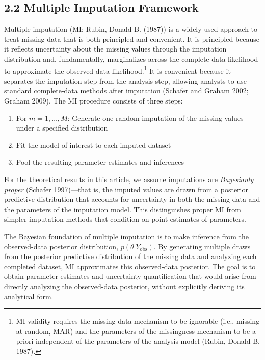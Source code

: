 \documentclass[
]{article}
\providecommand{\tightlist}{%
  \setlength{\itemsep}{0pt}\setlength{\parskip}{0pt}}
\begin{document}
\subsection{2.2 Multiple Imputation
Framework}\label{multiple-imputation-framework}

Multiple imputation (MI; Rubin, Donald B. (1987)) is a widely-used
approach to treat missing data that is both principled and convenient.
It is principled because it reflects uncertainty about the missing
values through the imputation distribution and, fundamentally,
marginalizes across the complete-data likelihood to approximate the
observed-data likelihood.\footnote{MI validity requires the missing data
  mechanism to be ignorable (i.e., missing at random, MAR) and the
  parameters of the missingness mechanism to be a priori independent of
  the parameters of the analysis model (Rubin, Donald B. 1987).} It is
convenient because it separates the imputation step from the analysis
step, allowing analysts to use standard complete-data methods after
imputation (Schafer and Graham 2002; Graham 2009). The MI procedure
consists of three steps:

\begin{enumerate}
\def\labelenumi{\arabic{enumi}.}
\tightlist
\item
  For \(m = 1, \ldots, M\): Generate one random imputation of the
  missing values under a specified distribution
\item
  Fit the model of interest to each imputed dataset
\item
  Pool the resulting parameter estimates and inferences
\end{enumerate}

For the theoretical results in this article, we assume imputations are
\emph{Bayesianly proper} (Schafer 1997)---that is, the imputed values
are drawn from a posterior predictive distribution that accounts for
uncertainty in both the missing data and the parameters of the
imputation model. This distinguishes proper MI from simpler imputation
methods that condition on point estimates of parameters.

The Bayesian foundation of multiple imputation is to make inference from
the observed-data posterior distribution,
\(p(\theta | Y_{\text{obs}})\). By generating multiple draws from the
posterior predictive distribution of the missing data and analyzing each
completed dataset, MI approximates this observed-data posterior. The
goal is to obtain parameter estimates and uncertainty quantification
that would arise from directly analyzing the observed-data posterior,
without explicitly deriving its analytical form.
\end{document}
